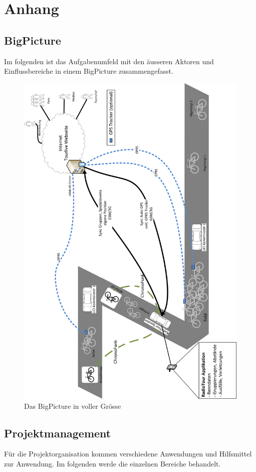 \chapter{Anhang}

\section{BigPicture}
\label{fig:bigpicture}
Im folgenden ist das Aufgabenumfeld mit den äusseren Aktoren und Einflussbereiche in einem BigPicture zusammengefasst.
\begin{figure}
\includegraphics[scale=0.8]{07anhang/images/bigpicture.png}
\caption{Das BigPicture in voller Grösse}
\end{figure}

\section{Projektmanagement}
Für die Projektorganisation kommen verschiedene Anwendungen und Hilfsmittel zur Anwendung. Im folgenden werde die einzelnen Bereiche behandelt.

